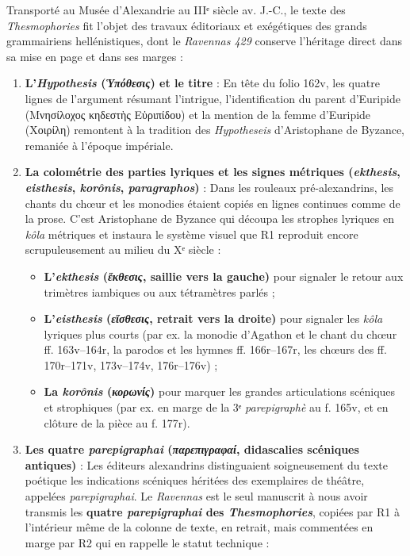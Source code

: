 \documentclass[11pt, a4paper, twoside]{article}
\renewcommand{\_}{\origunderscore\penalty0\relax}
\renewcommand{\texttt}[1]{#1}
\newcommand{\Run}{\textbf{R}\textsuperscript{1}}
\newcommand{\Rdeux}{\textbf{R}\textsuperscript{2}}
\def\Run{R1}%
\def\Rdeux{R2}%
\begin{document}
Transporté au Musée d'Alexandrie au IIIᵉ siècle av. J.-C., le texte des \textit{Thesmophories} fit l'objet des travaux éditoriaux et exégétiques des grands grammairiens hellénistiques, dont le \textit{Ravennas 429} conserve l'héritage direct dans sa mise en page et dans ses marges :
\begin{enumerate}[leftmargin=1.6em, itemsep=2pt]
  \item \textbf{L'\textit{Hypothesis} (\textit{Ὑπόθεσις}) et le titre} : En tête du folio \texttt{162v}, les quatre lignes de l'argument résumant l'intrigue, l'identification du parent d'Euripide (\texttt{Μνησίλοχος κηδεστὴς Εὐριπίδου}) et la mention de la femme d'Euripide (\texttt{Χοιρίλη}) remontent à la tradition des \textit{Hypotheseis} d'Aristophane de Byzance, remaniée à l'époque impériale.
  \item \textbf{La colométrie des parties lyriques et les signes métriques (\textit{ekthesis}, \textit{eisthesis}, \textit{korônis}, \textit{paragraphos})} : Dans les rouleaux pré-alexandrins, les chants du chœur et les monodies étaient copiés en lignes continues comme de la prose. C'est Aristophane de Byzance qui découpa les strophes lyriques en \textit{kôla} métriques et instaura le système visuel que \Run{} reproduit encore scrupuleusement au milieu du Xᵉ siècle :
  \begin{itemize}[leftmargin=1.5em, itemsep=2pt]
    \item \textbf{L'\textit{ekthesis} (\textit{ἔκθεσις}, saillie vers la gauche)} pour signaler le retour aux trimètres iambiques ou aux tétramètres parlés ;
    \item \textbf{L'\textit{eisthesis} (\textit{εἴσθεσις}, retrait vers la droite)} pour signaler les \textit{kôla} lyriques plus courts (par ex. la monodie d'Agathon et le chant du chœur \texttt{ff. 163v–164r}, la parodos et les hymnes \texttt{ff. 166r–167r}, les chœurs des \texttt{ff. 170r–171v}, \texttt{173v–174v}, \texttt{176r–176v}) ;
    \item \textbf{La \textit{korônis} (\textit{κορωνίς})} pour marquer les grandes articulations scéniques et strophiques (par ex. en marge de la 3ᵉ \textit{parepigraphè} au \texttt{f. 165v}, et en clôture de la pièce au \texttt{f. 177r}).
  \end{itemize}
  \item \textbf{Les quatre \textit{parepigraphai} (\textit{παρεπιγραφαί}, didascalies scéniques antiques)} : Les éditeurs alexandrins distinguaient soigneusement du texte poétique les indications scéniques héritées des exemplaires de théâtre, appelées \textit{parepigraphai}. Le \textit{Ravennas} est le seul manuscrit à nous avoir transmis les \textbf{quatre \textit{parepigraphai} des \textit{Thesmophories}}, copiées par \Run{} à l'intérieur même de la colonne de texte, en retrait, mais commentées en marge par \Rdeux{} qui en rappelle le statut technique :

\end{enumerate}
\end{document}
